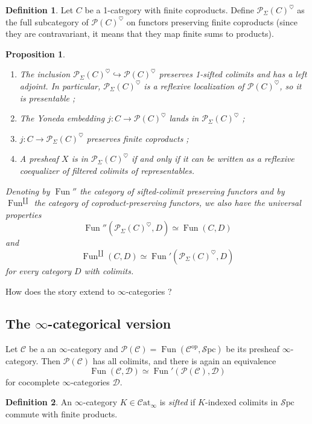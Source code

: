 \documentclass[11pt]{article}
\newtheorem{proposition}{Proposition}
\theoremstyle{definition}
\newtheorem{definition}{Definition}
\newcommand{\C}{\mathcal{C}}
\newcommand{\Catinf}{\mathcal{C}\mathrm{at}_{\infty}}
\newcommand{\D}{\mathcal{D}}
\newcommand{\Fun}{\operatorname{Fun}}
\newcommand{\heart}{\heartsuit}
\newcommand{\op}{\mathrm{op}}
\renewcommand{\P}{\mathcal{P}}
\newcommand{\Spc}{\mathcal{S}\mathrm{pc}}
\begin{document}
\begin{definition}
    Let $C$ be a 1-category with finite coproducts.
    Define $\P_{\Sigma}(C)^{\heart}$ as the full subcategory of $\P(C)^{\heart}$ on functors preserving finite coproducts (since they are contravariant, it means that they map finite sums to products).
\end{definition}

\begin{proposition}
    \begin{enumerate}
        \item The inclusion $\P_{\Sigma}(C)^{\heart} \hookrightarrow \P(C)^{\heart}$ preserves 1-sifted colimits and has a left adjoint.
        In particular, $\P_{\Sigma}(C)^{\heart}$ is a reflexive localization of $\P(C)^{\heart}$, so it is presentable ;
        \item The Yoneda embedding $j : C \to \P(C)^{\heart}$ lands in $\P_{\Sigma}(C)^{\heart}$ ;
        \item $j : C \to \P_{\Sigma}(C)^{\heart}$ preserves finite coproducts ;
        \item A presheaf $X$ is in $\P_{\Sigma}(C)^{\heart}$ if and only if it can be written as a reflexive coequalizer of filtered colimits of representables.
    \end{enumerate}
    Denoting by $\Fun''$ the category of sifted-colimit preserving functors and by $\Fun^{\amalg}$ the category of coproduct-preserving functors, we also have the universal properties
    \[
        \Fun''(\P_{\Sigma}(C)^{\heart}, D) \simeq \Fun(C, D)
    \]
    and
    \[
        \Fun^{\amalg}(C, D) \simeq \Fun'(\P_{\Sigma}(C)^{\heart}, D)
    \]
    for every category $D$ with colimits.
\end{proposition}
How does the story extend to $\infty$-categories ?

\subsection{The $\infty$-categorical version}

Let $\C$ be a an $\infty$-category and $\P(\C) = \Fun(\C^{\op}, \Spc)$ be its presheaf $\infty$-category.
Then $\P(\C)$ has all colimits, and there is again an equivalence
\[
    \Fun(\C, \D) \simeq \Fun'(\P(\C), \D)
\]
for cocomplete $\infty$-categories $\D$.

\begin{definition}
    An $\infty$-category $K \in \Catinf$ is \emph{sifted} if $K$-indexed colimits in $\Spc$ commute with finite products.
\end{definition}
\end{document}
